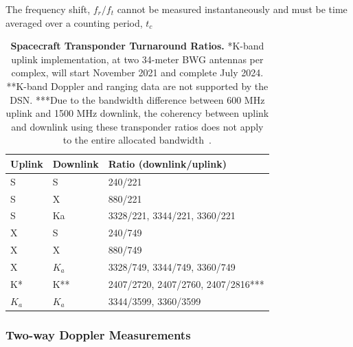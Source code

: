 The frequency shift, $f_r/f_t$ cannot be measured instantaneously and must be
time averaged over a counting period, $t_c$


\begin{table}[htp!]
    \renewcommand{\arraystretch}{1.5}
    \centering
    \caption{
        \textbf{Spacecraft Transponder Turnaround Ratios.} *K-band uplink
        implementation, at two 34-meter BWG antennas per complex, will start
        November 2021 and complete July 2024. **K-band Doppler and ranging data are
        not supported by the DSN. ***Due to the bandwidth difference between 600 MHz
        uplink and 1500 MHz downlink, the coherency between uplink and downlink
        using these transponder ratios does not apply to the entire allocated
        bandwidth~\cite{Berner2020}.
    }
    \label{tab:turnaround-ratios}
    \begin{tabular}{lll}
        \hline
        \textbf{Uplink} & \textbf{Downlink} & \textbf{Ratio (downlink/uplink)}   \\
        \hline\hline
        S               & S                 & 240/221                            \\
        S               & X                 & 880/221                            \\
        S               & Ka                & 3328/221, 3344/221, 3360/221       \\
        X               & S                 & 240/749                            \\
        X               & X                 & 880/749                            \\
        X               & $K_a$             & 3328/749, 3344/749, 3360/749       \\
        K*              & K**               & 2407/2720, 2407/2760, 2407/2816*** \\
        $K_a$           & $K_a$             & 3344/3599, 3360/3599               \\
        \hline
    \end{tabular}
\end{table}

\subsubsection{Two-way Doppler Measurements}

